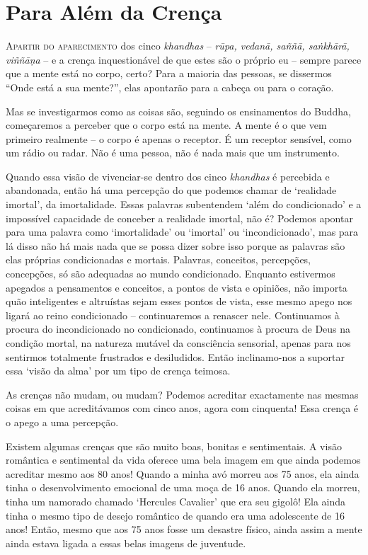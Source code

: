 \chapter{Para Além da Crença}

\lettrine{A}{\space partir do aparecimento} dos cinco \emph{khandhas} -- \emph{rūpa, vedanā, saññā,
  saṅkhārā, viññāṇa} -- e a crença inquestionável de que estes são o próprio eu
-- sempre parece que a mente está no corpo, certo? Para a maioria das pessoas, se
dissermos ``Onde está a sua mente?'', elas apontarão para a cabeça ou para o
coração.

Mas se investigarmos como as coisas são, seguindo os ensinamentos do Buddha,
começaremos a perceber que o corpo está na mente. A mente é o que vem primeiro
realmente -- o corpo é apenas o receptor. É um receptor sensível, como um rádio
ou radar. Não é uma pessoa, não é nada mais que um instrumento.

Quando essa visão de vivenciar-se dentro dos cinco \emph{khandhas} é percebida e
abandonada, então há uma percepção do que podemos chamar de `realidade imortal',
da imortalidade. Essas palavras subentendem `além do condicionado' e a
impossível capacidade de conceber a realidade imortal, não é? Podemos apontar
para uma palavra como `imortalidade' ou `imortal' ou `incondicionado', mas para
lá disso não há mais nada que se possa dizer sobre isso porque as palavras são
elas próprias condicionadas e mortais. Palavras, conceitos, percepções,
concepções, só são adequadas ao mundo condicionado. Enquanto estivermos apegados
a pensamentos e conceitos, a pontos de vista e opiniões, não importa quão
inteligentes e altruístas sejam esses pontos de vista, esse mesmo apego nos
ligará ao reino condicionado -- continuaremos a renascer nele. Continuamos à
procura do incondicionado no condicionado, continuamos à procura de Deus na
condição mortal, na natureza mutável da consciência sensorial, apenas para nos
sentirmos totalmente frustrados e desiludidos. Então inclinamo-nos a suportar
essa `visão da alma' por um tipo de crença teimosa.

As crenças não mudam, ou mudam? Podemos acreditar exactamente nas mesmas coisas
em que acreditávamos com cinco anos, agora com cinquenta! Essa crença é o apego
a uma percepção.

Existem algumas crenças que são muito boas, bonitas e sentimentais. A visão
romântica e sentimental da vida oferece uma bela imagem em que ainda podemos
acreditar mesmo aos 80 anos! Quando a minha avó morreu aos 75 anos, ela ainda
tinha o desenvolvimento emocional de uma moça de 16 anos. Quando ela morreu,
tinha um namorado chamado `Hercules Cavalier' que era seu gigolô! Ela ainda
tinha o mesmo tipo de desejo romântico de quando era uma adolescente de 16 anos!
Então, mesmo que aos 75 anos fosse um desastre físico, ainda assim a mente ainda
estava ligada a essas belas imagens de juventude.

